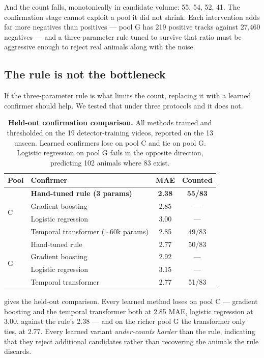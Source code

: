 And the count falls, monotonically in candidate volume: 55, 54, 52, 41. The confirmation
stage cannot exploit a pool it did not shrink. Each intervention adds far more negatives
than positives --- pool G has 219 positive tracks against 27,460 negatives --- and a
three-parameter rule tuned to survive that ratio must be aggressive enough to reject real
animals along with the noise.

\subsection{The rule is not the bottleneck}
\label{sec:learned}

If the three-parameter rule is what limits the count, replacing it with a learned confirmer
should help. We tested that under three protocols and it does not.

\begin{table}[t]
\centering\small
\begin{tabular}{llcc}
\toprule
Pool & Confirmer & MAE & Counted \\
\midrule
\multirow{4}{*}{C} & \textbf{Hand-tuned rule (3 params)} & \textbf{2.38} & \textbf{55/83} \\
 & Gradient boosting & 2.85 & --- \\
 & Logistic regression & 3.00 & --- \\
 & Temporal transformer ($\sim$60k params) & 2.85 & 49/83 \\
\midrule
\multirow{4}{*}{G} & Hand-tuned rule & 2.77 & 50/83 \\
 & Gradient boosting & 2.92 & --- \\
 & Logistic regression & 3.15 & --- \\
 & Temporal transformer & 2.77 & 51/83 \\
\bottomrule
\end{tabular}
\caption{\textbf{Held-out confirmation comparison.} All methods trained and thresholded on
the 19 detector-training videos, reported on the 13 unseen. Learned confirmers lose on pool
C and tie on pool G. Logistic regression on pool G fails in the opposite direction,
predicting 102 animals where 83 exist.}
\label{tab:confirmers}
\end{table}

 gives the held-out comparison. Every learned method loses on pool C ---
gradient boosting and the temporal transformer both at 2.85 MAE, logistic regression at
3.00, against the rule's 2.38 --- and on the richer pool G the transformer only ties, at
2.77. Every learned variant \emph{under-counts harder} than the rule, indicating that they
reject additional candidates rather than recovering the animals the rule discards.

